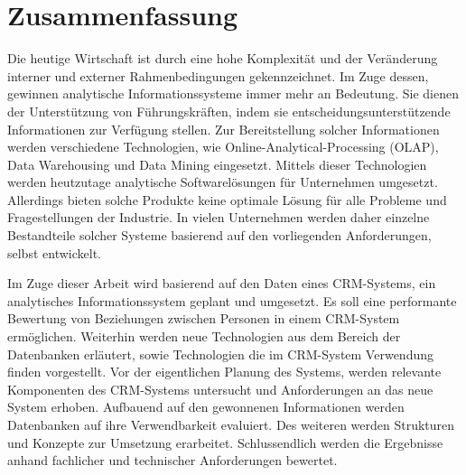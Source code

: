
\chapter*{\centering Zusammenfassung}

Die heutige Wirtschaft ist durch eine hohe Komplexität und der Veränderung interner und externer Rahmenbedingungen gekennzeichnet. Im Zuge dessen, gewinnen analytische Informationssysteme immer mehr an Bedeutung. Sie dienen der Unterstützung von Führungskräften, indem sie entscheidungsunterstützende Informationen zur Verfügung stellen. Zur Bereitstellung solcher Informationen werden verschiedene Technologien, wie Online-Analytical-Processing (OLAP), Data Warehousing und Data Mining eingesetzt. Mittels dieser Technologien werden heutzutage analytische Softwarelösungen für Unternehmen umgesetzt. Allerdings bieten solche Produkte keine optimale Lösung für alle Probleme und Fragestellungen der Industrie. In vielen Unternehmen werden daher einzelne Bestandteile solcher Systeme basierend auf den vorliegenden Anforderungen, selbst entwickelt.

Im Zuge dieser Arbeit wird basierend auf den Daten eines CRM-Systems, ein analytisches Informationssystem geplant und umgesetzt. Es soll eine performante Bewertung von Beziehungen zwischen Personen in einem CRM-System ermöglichen. Weiterhin werden neue Technologien aus dem Bereich der Datenbanken erläutert, sowie Technologien die im CRM-System Verwendung finden vorgestellt. Vor der eigentlichen Planung des Systems, werden relevante Komponenten des CRM-Systems untersucht und Anforderungen an das neue System erhoben. Aufbauend auf den gewonnenen Informationen werden Datenbanken auf ihre Verwendbarkeit evaluiert. Des weiteren werden Strukturen und Konzepte zur Umsetzung erarbeitet. Schlussendlich werden die Ergebnisse anhand fachlicher und technischer Anforderungen bewertet.